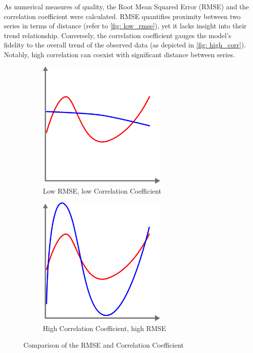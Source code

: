As numerical measures of quality, the Root Mean Squared Error (RMSE) and the correlation coefficient were calculated.
RMSE quantifies proximity between two series in terms of distance (refer to \autoref*{fig: low_rmse}), yet it lacks insight into their trend relationship.
Conversely, the correlation coefficient gauges the model's fidelity to the overall trend of the observed data (as depicted in \autoref*{fig: high_corr}).
Notably, high correlation can coexist with significant distance between series.

\begin{figure}[H]
    \centering
    \begin{subfigure}{0.35\textwidth}
        \centering
        \includegraphics[width=0.7\textwidth]{resources/images/low_rmse.png}
        \caption{Low RMSE, low Correlation Coefficient}
        \label{fig: low_rmse}
    \end{subfigure}
    \hspace{0.5cm}
    \begin{subfigure}{0.35\textwidth}
        \centering
        \includegraphics[width=0.7\textwidth]{resources/images/high_corr.png}
        \caption{High Correlation Coefficient, high RMSE}
        \label{fig: high_corr}
    \end{subfigure}
    \caption{Comparison of the RMSE and Correlation Coefficient}
\end{figure}


